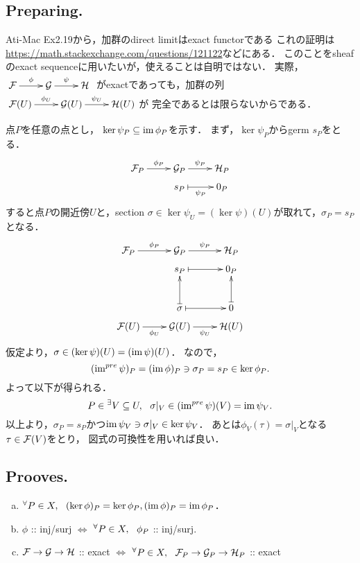 \documentclass[a4paper]{jsarticle}
\begin{document}
    \subsection{Preparing.}
    Ati-Mac Ex2.19から，加群のdirect limitはexact functorである
    これの証明は\url{https://math.stackexchange.com/questions/121122}などにある．
    このことをsheafのexact sequenceに用いたいが，使えることは自明ではない．
    実際，$\xymatrix{ \shF \ar[r]^-{\phi}& \shG \ar[r]^-{\psi}& \shH }$
    がexactであっても，加群の列
    $\xymatrix{ \shF(U) \ar[r]^-{\phi_U}& \shG(U) \ar[r]^-{\psi_U}& \shH(U) }$が
    完全であるとは限らないからである．

    点$P$を任意の点とし，
    $\ker \psi_P \subseteq \operatorname{im} \phi_P$を示す．
    まず，$\ker \psi_P$からgerm $s_P$をとる．
    \[
    \xymatrix@R=5pt
    {
    \shF_P \ar[r]^-{\phi_P}& \shG_P \ar[r]^-{\psi_P}& \shH_P \\
    {} & s_P \ar@{|->}[r]_-{\psi_P} & 0_P
    }
    \]
    すると点$P$の開近傍$U$と，section $\sigma \in \ker \psi_U=(\ker \psi)(U)$が取れて，$\sigma_P=s_P$となる．
    \[
    \xymatrix@R=5pt
    {
    \shF_P \ar[r]^-{\phi_P}& \shG_P \ar[r]^-{\psi_P}& \shH_P \\
    {} & s_P \ar@{|->}[r] & 0_P \\
    {} & {} & {} \\
    {} & {} & {} \\
    {} & \sigma \ar@{|->}[uuu] \ar@{|->}[r] & 0 \ar@{|->}[uuu]\\
    \shF(U) \ar[r]_-{\phi_U}& \shG(U) \ar[r]_-{\psi_U}& \shH(U) \\
    }
    \]
    仮定より，$\sigma \in (\ker \psi)(U)=(\operatorname{im} \psi)(U)$．
    なので，
    \[ (\operatorname{im}^{pre} \psi)_P=(\operatorname{im} \phi)_P \ni \sigma_P=s_P \in \ker \phi_P. \]
    よって以下が得られる．
    \[ P \in {}^{\exists}V \subseteq U,~~ \sigma|_V \in (\operatorname{im}^{pre} \psi)(V)=\operatorname{im} \psi_V. \]
    以上より，$\sigma_P=s_P$かつ$\operatorname{im} \psi_V \ni \sigma|_V \in \ker \psi_V$．
    あとは$\phi_V(\tau)=\sigma|_V$となる$\tau \in \mathcal{F}(V)$をとり，
    図式の可換性を用いれば良い．

    \subsection{Prooves.}
    \begin{enumerate}[(a)]
        \item ${}^{\forall} P \in X,~~ (\ker \phi)_P=\ker \phi_P, (\operatorname{im} \phi)_P=\operatorname{im} \phi_P$．
        \item $\phi$ :: inj/surj $\iff$ ${}^{\forall} P \in X,~~ \phi_P$ :: inj/surj.
        \item $\mathcal{F} \to \mathcal{G} \to \mathcal{H}$ :: exact $\iff$ ${}^{\forall} P \in X,~~ \mathcal{F}_P \to \mathcal{G}_P \to \mathcal{H}_P$ :: exact
    \end{enumerate}
\end{document}
